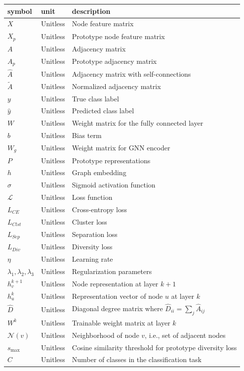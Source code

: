 \documentclass[12pt]{article}
\begin{document}
\renewcommand{\arraystretch}{1.2}
\noindent \begin{longtable*}{l l p{12cm}} \toprule
\textbf{symbol} & \textbf{unit} & \textbf{description} \\
\midrule 
$X$ & Unitless & Node feature matrix \\
$X_p$ & Unitless & Prototype node feature matrix \\
$A$ & Unitless & Adjacency matrix \\
$A_p$ & Unitless & Prototype adjacency matrix \\
$\hat{A}$ & Unitless & Adjacency matrix with self-connections \\
$\tilde{A}$ & Unitless & Normalized adjacency matrix \\
$y$ & Unitless & True class label \\
$\hat{y}$ & Unitless & Predicted class label \\
$W$ & Unitless & Weight matrix for the fully connected layer \\
$b$ & Unitless & Bias term \\
$W_g$ & Unitless & Weight matrix for GNN encoder \\
$P$ & Unitless & Prototype representations \\
$h$ & Unitless & Graph embedding \\
$\sigma$ & Unitless & Sigmoid activation function \\
$\mathcal{L}$ & Unitless & Loss function \\
$L_{CE}$ & Unitless & Cross-entropy loss \\
$L_{Clst}$ & Unitless & Cluster loss \\
$L_{Sep}$ & Unitless & Separation loss \\
$L_{Div}$ & Unitless & Diversity loss \\
$\eta$ & Unitless & Learning rate \\
$\lambda_1, \lambda_2, \lambda_3$ & Unitless & Regularization parameters \\
$h_v^{k+1}$ & Unitless & Node representation at layer $k+1$ \\
$h_u^k$ & Unitless & Representation vector of node $u$ at layer $k$ \\
$\hat{D}$ & Unitless & Diagonal degree matrix where $\hat{D}_{ii} = \sum_j \hat{A}_{ij}$ \\
$W^k$ & Unitless & Trainable weight matrix at layer $k$ \\
$\mathcal{N}(v)$ & Unitless & Neighborhood of node $v$, i.e., set of adjacent nodes \\
$s_{\max}$ & Unitless & Cosine similarity threshold for prototype diversity loss \\
$C$ & Unitless & Number of classes in the classification task \\
\bottomrule
\end{longtable*}
\end{document}

